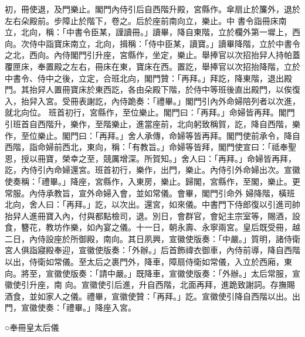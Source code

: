 \begin{pinyinscope}
 初，冊使退，及門樂止。閣門內侍引后自西階升殿，宮縣作。傘扇止於簾外，退於左右朵殿前。步障止於階下，卷之。后於座前南向立，樂止。中
 書令詣冊床南立，北向，稱：「中書令臣某，謹讀冊。」讀畢，降自東階，立於欄外第一墀上，西向。次侍中詣寶床南立，北向，揖稱：「侍中臣某，讀寶。」讀畢降階，立於中書令之北，西向。內侍閣門引升座，宮縣作，坐定，樂止。舉捧官以次招抬舁人持帕蓋覆匣床，奉置殿之左右，冊床在東，寶床在西。置訖，舉捧官以次招抬降階，立於中書令、侍中之後，立定，合班北向，閣門贊：「再拜。」拜訖，降東階，退出殿門。其抬舁人置冊寶床於東西訖，各由朵殿下階，於侍中等班後直出殿門，以俟復入，抬舁入宮。受冊表謝訖，內侍跪奏：「禮畢。」閣門引內外命婦陪列者以次進，就北向位。
 班首初行，宮縣作，至位樂止。閣門曰：「再拜。」命婦皆再拜。閣門引班首自西階升，樂作，至階樂止，進當座前，北向躬致稱賀，訖，降自西階，樂作，至位樂止。閣門曰：「再拜。」舍人承傳，命婦等皆再拜。閣門使前承令，降自西階，詣命婦前西北，東向，稱：「有教旨。」命婦等皆拜，閣門使宣曰：「祗奉聖恩，授以冊寶，榮幸之至，競厲增深。所賀知。」舍人曰：「再拜。」命婦皆再拜，訖，內侍引內命婦還宮。班首初行，樂作，出門，樂止。內侍引外命婦出次。宣徽使奏稱：「禮畢。」降座，宮縣作，入東房，樂止。歸閣，宮縣作，至閣，樂止。更常服。內侍承教旨，宣外命婦入會，並如常儀。會畢，閣門引命外
 婦降階，橫班北向，舍人曰：「再拜。」訖，以次出。還宮，如來儀。中書門下侍郎復以引進司帥抬舁人進冊寶入內，付與都點檢司，退。別日，會群官，會妃主宗室等，賜酒，設食，簪花，教坊作樂，如內宴之儀。十一日，朝永壽、永寧兩宮。皇后既受冊，越二日，內侍設座於所御殿，南向。其日夙興，宣徽使版奏：「中嚴。」質明，諸侍衛宮人俱詣寢殿奉迎，宣徽使版奏：「外辦。」后首飾禕衣御車，內侍前導，降自西階以出，侍衛如常儀。至太后之裹門外，降車，障扇侍衛如常儀，入立於西廂，東向。將至，宣徽使版奏：「請中嚴。」既降車，宣徽使版奏：「外辦。」太后常服，宣徽使引升座，南
 向。宣徽使引后進，升自西階，北面再拜，進跪致謝詞。存撫賜酒食，並如家人之儀。禮畢，宣徽使贊：「再拜。」訖。宣徽使引降自西階以出。出門，宣徽使奏：「禮畢。」降座入宮。



 ○奉冊皇太后儀




\end{pinyinscope}
